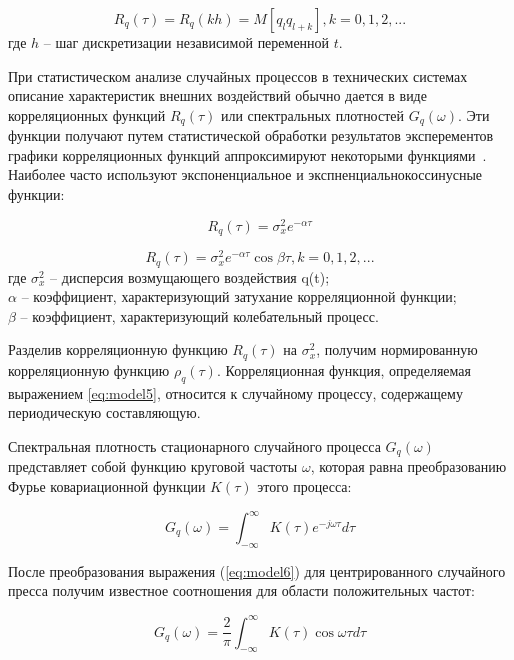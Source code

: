 \begin{equation} \label{eq:model3}
{R}_{q}(\tau) = {R}_{q}(kh) = M[q_l q_{l+k}], k=0,1,2,...
\end{equation}
где $h$ – шаг дискретизации независимой переменной $t$.

При статистическом анализе случайных процессов в технических системах
описание характеристик внешних воздействий обычно дается в виде
корреляционных функций ${R}_{q}(\tau)$ или спектральных плотностей $G_q(\omega)$. Эти
функции получают путем статистической обработки результатов эксперементов
графики корреляционных функций аппроксимируют некоторыми функциями~\cite{modeling:2004}. Наиболее часто используют экспоненциальное и экспненциальнокоссинусные функции:


\begin{equation} \label{eq:model4}
{R}_{q}(\tau) = {\sigma}_{x}^{2} e^{-\alpha \tau}
\end{equation}

\begin{equation} \label{eq:model5}
{R}_{q}(\tau) = {\sigma}_{x}^{2} e^{-\alpha \tau} \cos\beta\tau, k=0,1,2,...
\end{equation}
где ${\sigma}_{x}^{2}$ -- дисперсия возмущающего воздействия q(t);\\
$\alpha$ -- коэффициент, характеризующий затухание корреляционной функции;\\
$\beta$ -- коэффициент, характеризующий колебательный процесс.


Разделив корреляционную функцию ${R}_{q}(\tau)$ на ${\sigma}_{x}^{2}$, получим нормированную
корреляционную функцию ${\rho}_{q}(\tau)$. Корреляционная функция, определяемая
выражением \ref{eq:model5}, относится к случайному процессу, содержащему
периодическую составляющую.

Спектральная плотность стационарного случайного процесса $G_q(\omega)$
представляет собой функцию круговой частоты $\omega$, которая равна
преобразованию Фурье ковариационной функции $K(\tau)$ этого процесса:

\begin{equation} \label{eq:model6}
G_q(\omega) = \int_{-\infty}^{\infty} K(\tau) e^{-j\omega\tau} d\tau
\end{equation}

После преобразования выражения (\ref{eq:model6}) для центрированного случайного
пресса получим известное соотношения для области положительных частот:

\begin{equation} \label{eq:model7}
G_q(\omega) = \frac{2}{\pi}\int_{-\infty}^{\infty} K(\tau) \cos\omega\tau d\tau
\end{equation}

